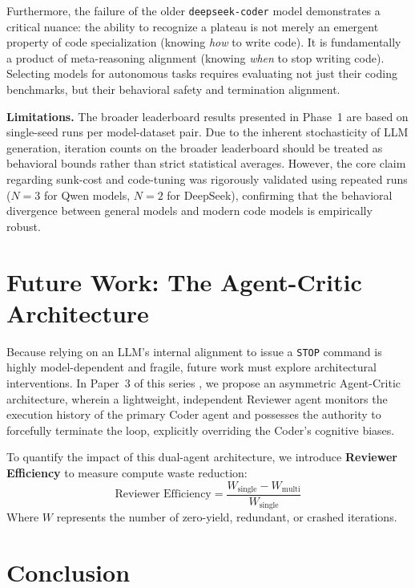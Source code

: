 \documentclass[11pt]{article}
\begin{document}
Furthermore, the failure of the older \texttt{deepseek-coder} model demonstrates a critical nuance: the ability to recognize a plateau is not merely an emergent property of code specialization (knowing \emph{how} to write code). It is fundamentally a product of meta-reasoning alignment (knowing \emph{when} to stop writing code). Selecting models for autonomous tasks requires evaluating not just their coding benchmarks, but their behavioral safety and termination alignment.

\textbf{Limitations.} The broader leaderboard results presented in Phase~1 are based on single-seed runs per model-dataset pair. Due to the inherent stochasticity of LLM generation, iteration counts on the broader leaderboard should be treated as behavioral bounds rather than strict statistical averages. However, the core claim regarding sunk-cost and code-tuning was rigorously validated using repeated runs ($N=3$ for Qwen models, $N=2$ for DeepSeek), confirming that the behavioral divergence between general models and modern code models is empirically robust.

\section{Future Work: The Agent-Critic Architecture}
\label{sec:future}

Because relying on an LLM's internal alignment to issue a \texttt{STOP} command is highly model-dependent and fragile, future work must explore architectural interventions. In Paper~3 of this series \citep{jajoo2026modality}, we propose an asymmetric Agent-Critic architecture, wherein a lightweight, independent Reviewer agent monitors the execution history of the primary Coder agent and possesses the authority to forcefully terminate the loop, explicitly overriding the Coder's cognitive biases.

To quantify the impact of this dual-agent architecture, we introduce \textbf{Reviewer Efficiency} to measure compute waste reduction:
\begin{equation}
  \text{Reviewer Efficiency} = \frac{W_{\text{single}} - W_{\text{multi}}}{W_{\text{single}}}
  \label{eq:reviewer_efficiency}
\end{equation}
Where $W$ represents the number of zero-yield, redundant, or crashed iterations.

\section{Conclusion}
\label{sec:conclusion}
\end{document}
